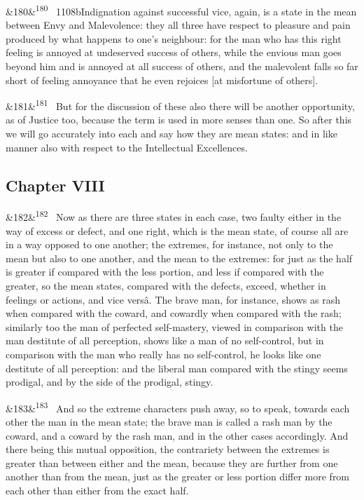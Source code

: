 \documentclass[12pt]{article}
\newcommand{\para}[1][]{\par\noindent\ifx&#1&\else\textsuperscript{\footnotesize #1}~\fi}
\begin{document}
\para[180] 1108bIndignation against successful vice, again, is a state in the mean between Envy and Malevolence: they all three have respect to pleasure and pain produced by what happens to one's neighbour: for the man who has this right feeling is annoyed at undeserved success of others, while the envious man goes beyond him and is annoyed at all success of others, and the malevolent falls so far short of feeling annoyance that he even rejoices [at misfortune of others].

\para[181] But for the discussion of these also there will be another opportunity, as of Justice too, because the term is used in more senses than one. So after this we will go accurately into each and say how they are mean states: and in like manner also with respect to the Intellectual Excellences.

\subsection*{Chapter VIII}

\para[182] Now as there are three states in each case, two faulty either in the way of excess or defect, and one right, which is the mean state, of course all are in a way opposed to one another; the extremes, for instance, not only to the mean but also to one another, and the mean to the extremes: for just as the half is greater if compared with the less portion, and less if compared with the greater, so the mean states, compared with the defects, exceed, whether in feelings or actions, and vice versâ. The brave man, for instance, shows as rash when compared with the coward, and cowardly when compared with the rash; similarly too the man of perfected self-mastery, viewed in comparison with the man destitute of all perception, shows like a man of no self-control, but in comparison with the man who really has no self-control, he looks like one destitute of all perception: and the liberal man compared with the stingy seems prodigal, and by the side of the prodigal, stingy.

\para[183] And so the extreme characters push away, so to speak, towards each other the man in the mean state; the brave man is called a rash man by the coward, and a coward by the rash man, and in the other cases accordingly. And there being this mutual opposition, the contrariety between the extremes is greater than between either and the mean, because they are further from one another than from the mean, just as the greater or less portion differ more from each other than either from the exact half.
\end{document}
